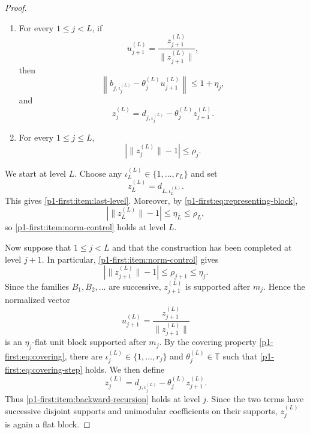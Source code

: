 \documentclass[11pt,reqno]{amsart}
\makeatletter
\theoremstyle{plain}
\theoremstyle{definition}
\newcommand{\T}{\mathbb T}
\newcounter{problempaper}
\newenvironment{problempaperbody}{%
  \setcounter{subsection}{0}%
  \setcounter{subsubsection}{0}%
  \setcounter{paragraph}{0}%
  \renewcommand{\thesubsection}{\arabic{subsection}}%
  \renewcommand{\thesubsubsection}{\thesubsection.\arabic{subsubsection}}%
  \renewcommand{\theparagraph}{\thesubsubsection.\arabic{paragraph}}%
  \let\problem@outersection\section
  \let\problem@outersubsection\subsection
  \let\problem@outersubsubsection\subsubsection
  \let\problem@outerparagraph\paragraph
  \let\section\problem@papersection
  \let\subsection\problem@papersubsection
  \let\subsubsection\problem@papersubsubsection
}{%
  \let\section\problem@outersection
  \let\subsection\problem@outersubsection
  \let\subsubsection\problem@outersubsubsection
  \let\paragraph\problem@outerparagraph
}
\newcommand{\problem@target}[2]{%
  \hypertarget{problem-\theproblempaper-#1-#2}{}%
}
\newcommand{\problem@paperheading}[3]{%
  \par\bigskip
  \problem@target{#1}{#2}%
  \noindent{\large\bfseries #2.\quad #3\par}%
  \nobreak\smallskip
}
\newcommand{\problem@papersubheading}[3]{%
  \par\medskip
  \problem@target{#1}{#2}%
  \noindent{\normalsize\bfseries #2.\quad #3\par}%
  \nobreak\smallskip
}
\newcommand{\problem@papersubsubheading}[3]{%
  \par\smallskip
  \problem@target{#1}{#2}%
  \noindent{\normalsize\itshape #2.\quad #3.\ }%
}
\def\problem@papersection{%
  \@ifstar{\problem@papersectionstar}{\problem@papersectionnostar}%
}
\def\problem@papersectionstar#1{%
  \par\bigskip\noindent{\large\bfseries #1\par}\nobreak\smallskip
}
\def\problem@papersectionnostar#1{%
  \refstepcounter{subsection}%
  \setcounter{subsubsection}{0}%
  \setcounter{paragraph}{0}%
  \problem@paperheading{section}{\thesubsection}{#1}%
  \problem@writecontentsline{section}{\thesubsection}{#1}%
}
\def\problem@papersubsection{%
  \@ifstar{\problem@papersubsectionstar}{\problem@papersubsectionnostar}%
}
\def\problem@papersubsectionstar#1{%
  \par\medskip\noindent{\normalsize\bfseries #1\par}\nobreak\smallskip
}
\def\problem@papersubsectionnostar#1{%
  \refstepcounter{subsubsection}%
  \setcounter{paragraph}{0}%
  \problem@papersubheading{subsection}{\thesubsubsection}{#1}%
  \problem@writecontentsline{subsection}{\thesubsubsection}{#1}%
}
\def\problem@papersubsubsection{%
  \@ifstar{\problem@papersubsubsectionstar}{\problem@papersubsubsectionnostar}%
}
\def\problem@papersubsubsectionstar#1{%
  \par\smallskip\noindent{\normalsize\itshape #1.\ }%
}
\def\problem@papersubsubsectionnostar#1{%
  \refstepcounter{paragraph}%
  \problem@papersubsubheading{subsubsection}{\theparagraph}{#1}%
  \problem@writecontentsline{subsubsection}{\theparagraph}{#1}%
}
\newcommand{\problem@writecontentsline}[3]{%
  \begingroup
  \protected@write\@auxout{}{%
    \string\problemcontentsentry{\theproblempaper}{#1}{#2}{#3}{\thepage}%
  }%
  \endgroup
}
\newcommand{\problemcontentsentry}[5]{%
  \@ifundefined{problemcontents@#1}{%
    \expandafter\gdef\csname problemcontents@#1\endcsname{}%
  }{}%
  \expandafter\g@addto@macro\csname problemcontents@#1\endcsname{%
    \problemcontentsline{#1}{#2}{#3}{#4}{#5}%
  }%
}
\newcommand{\problemcontentslink}[4]{%
  \hyperlink{problem-#1-#2-#3}{#4}%
}
\newcommand{\problemcontentsline}[5]{%
  \ifstrequal{#2}{section}{%
    \par\noindent
    \problemcontentslink{#1}{#2}{#3}{\makebox[2.5em][l]{#3}#4}%
    \nobreak\dotfill
    \problemcontentslink{#1}{#2}{#3}{#5}\par
  }{%
    \ifstrequal{#2}{subsection}{%
      \par\noindent\hspace*{1.5em}%
      \problemcontentslink{#1}{#2}{#3}{\makebox[3.5em][l]{#3}#4}%
      \nobreak\dotfill
      \problemcontentslink{#1}{#2}{#3}{#5}\par
    }{%
      \par\noindent\hspace*{3em}%
      \problemcontentslink{#1}{#2}{#3}{\makebox[4.5em][l]{#3}#4}%
      \nobreak\dotfill
      \problemcontentslink{#1}{#2}{#3}{#5}\par
    }%
  }%
}
\makeatother
\begin{document}
\begin{problempaperbody}
\begin{proof}
\begin{enumerate}[label=\textup{(\alph*)}]
\item\label{p1-first:item:backward-recursion} For every $1\leq j<L$, if
\begin{equation*}
        u_{j+1}^{(L)}=\frac{z_{j+1}^{(L)}}{\|z_{j+1}^{(L)}\|},
\end{equation*}
then
\begin{equation}
\label{p1-first:eq:covering-step}
        \left\|b_{j,\iota_j^{(L)}}-\theta_j^{(L)}u_{j+1}^{(L)}\right\|\leq 1+\eta_j,
\end{equation}
and
\begin{equation}
\label{p1-first:eq:z-recursion}
        z_j^{(L)}=d_{j,\iota_j^{(L)}}-\theta_j^{(L)}z_{j+1}^{(L)}.
\end{equation}

\item\label{p1-first:item:norm-control} For every $1\leq j\leq L$,
\begin{equation}
\label{p1-first:eq:z-error-target}
        |\|z_j^{(L)}\|-1|\leq \rho_j.
\end{equation}
\end{enumerate}

We start at level $L$. Choose any $\iota_L^{(L)}\in\{1,\ldots,r_L\}$ and set
\begin{equation*}
        z_L^{(L)}=d_{L,\iota_L^{(L)}}.
\end{equation*}
This gives \ref{p1-first:item:last-level}. Moreover, by \eqref{p1-first:eq:representing-block},
\begin{equation*}
        |\|z_L^{(L)}\|-1|\leq \eta_L\leq \rho_L,
\end{equation*}
so \ref{p1-first:item:norm-control} holds at level $L$.

Now suppose that $1\leq j<L$ and that the construction has been completed at level $j+1$. In particular, \ref{p1-first:item:norm-control} gives
\begin{equation*}
        |\|z_{j+1}^{(L)}\|-1|\leq \rho_{j+1}\leq \eta_j.
\end{equation*}
Since the families $B_1,B_2,\ldots$ are successive, $z_{j+1}^{(L)}$ is supported after $m_j$. Hence the normalized vector
\begin{equation*}
        u_{j+1}^{(L)}=\frac{z_{j+1}^{(L)}}{\|z_{j+1}^{(L)}\|}
\end{equation*}
is an $\eta_j$-flat unit block supported after $m_j$. By the covering property \eqref{p1-first:eq:covering}, there are $\iota_j^{(L)}\in\{1,\ldots,r_j\}$ and $\theta_j^{(L)}\in\T$ such that \eqref{p1-first:eq:covering-step} holds. We then define
\begin{equation*}
        z_j^{(L)}=d_{j,\iota_j^{(L)}}-\theta_j^{(L)}z_{j+1}^{(L)}.
\end{equation*}
Thus \ref{p1-first:item:backward-recursion} holds at level $j$. Since the two terms have successive disjoint supports and unimodular coefficients on their supports, $z_j^{(L)}$ is again a flat block.


\end{proof}
\end{problempaperbody}
\end{document}
